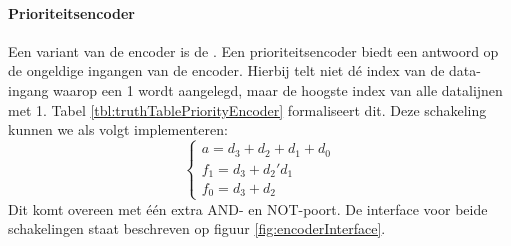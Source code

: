 \paragraph{Prioriteitsencoder}
Een variant van de encoder is de . Een prioriteitsencoder biedt een antwoord op de ongeldige ingangen van de encoder. Hierbij telt niet d\'e index van de data-ingang waarop een 1 wordt aangelegd, maar de hoogste index van alle datalijnen met 1. Tabel \ref{tbl:truthTablePriorityEncoder} formaliseert dit. Deze schakeling kunnen we als volgt implementeren:
\begin{equation}
\left\{
\begin{array}{l}
a=d_3+d_2+d_1+d_0\\
f_1=d_3+d_2'd_1\\
f_0=d_3+d_2
\end{array}
\right.
\end{equation}
Dit komt overeen met \'e\'en extra AND- en NOT-poort. De interface voor beide schakelingen staat beschreven op figuur \ref{fig:encoderInterface}.
